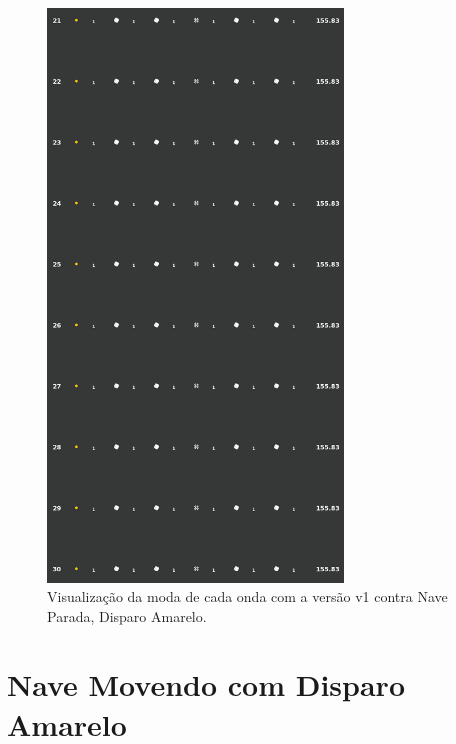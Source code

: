 \begin{figure}[H]
  \centering
  \includegraphics[width=0.7\textwidth]{figuras/ss/ss_yellowstill_ai_mode_1_3.png}
  \caption{Visualização da moda de cada onda com a versão v1 contra Nave Parada, Disparo Amarelo.}
  \label{fig:ss-moda-ys-1-3}
\end{figure}

\section{Nave Movendo com Disparo Amarelo}
\label{sec:apend-moda-ss-ym-v1}

